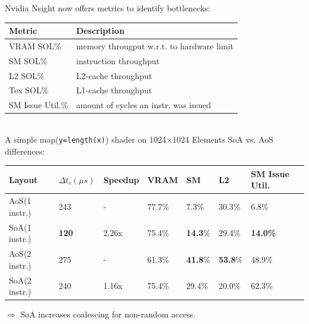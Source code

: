 \documentclass{beamer}
\let\oldcite=\cite
\renewcommand{\cite}[1]{\textcolor[rgb]{.55,.55,.89}{\oldcite{#1}}}
\begin{document}
\begin{frame}
Nvidia Nsight\cite{NVIDIA:METRICS} now offers metrics to identify bottlenecks:
\vspace{-5}
\begin{table}
  \footnotesize
  \begin{tabular}{ | l | l |}    \hline
    \textbf{Metric}   & \textbf{Description} \\ \hline
    VRAM SOL\%        & memory througput w.r.t. to hardware limit\\\hline
    SM SOL\%          & instruction throughput\\\hline
    L2 SOL\%          & L2-cache throughput\\\hline
    Tex SOL\%         & L1-cache throughput\\\hline
    SM Issue Util.\%  & amount of cycles an instr. was issued\\\hline
  \end{tabular}
\end{table}
\\
\vspace{5}
A simple map(\texttt{y=length(x)}) shader on 1024$\times$1024 Elements SoA vs. AoS differences:
\vspace{-15}
\begin{table}
  \footnotesize
  \begin{tabular}{ | l | l | l | l | l | l | l |}    \hline
    Layout &  $\Delta t_c (\mu s)$	& Speedup &VRAM     & SM     & L2     & SM Issue Util. \\\hline
    AoS(1 instr.)         & 243                   & -       &77.7\%   & 7.3\%  & 30.3\% & 6.8\% \\\hline
    SoA(1 instr.)         & \textbf{120}                   & 2.26x   &75.4\%   & \textbf{14.3}\% & 29.4\% & \textbf{14.0\%} \\\hline
    AoS(2 instr.)         & 275                   & -        &61.3\%           & \textbf{41.8}\% & \textbf{53.8}\% & 48.9\% \\\hline
    SoA(2 instr.)         & 240                   & 1.16x    &75.4\%  & 29.4\%          & 20.0\% & 62.3\% \\
    \hline
\end{tabular}
\end{table}
$\Rightarrow$ SoA increases coalescing for non-random access.
\end{frame}
\end{document}
